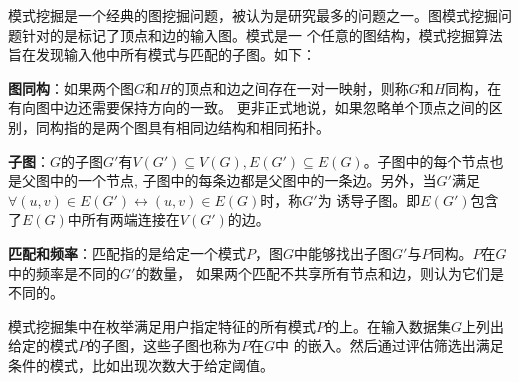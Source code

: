 \documentclass[master]{thesis-uestc}
\begin{document}
    模式挖掘是一个经典的图挖掘问题，被认为是研究最多的问题之一。图模式挖掘问题针对的是标记了顶点和边的输入图。模式是一
个任意的图结构，模式挖掘算法旨在发现输入他中所有模式与匹配的子图。如下：

    \textbf{图同构}：如果两个图$G$和$H$的顶点和边之间存在一对一映射，则称$G$和$H$同构，在有向图中边还需要保持方向的一致。
更非正式地说，如果忽略单个顶点之间的区别，同构指的是两个图具有相同边结构和相同拓扑。
    
    \textbf{子图}：$G$的子图$G'$有$V(G') \subseteq V(G), E(G') \subseteq E(G)$。子图中的每个节点也是父图中的一个节点,
子图中的每条边都是父图中的一条边。另外，当$G'$满足$\forall (u,v) \in E(G') \leftrightarrow (u,v) \in E(G)$时，称$G'$为
诱导子图。即$E(G')$包含了$E(G)$中所有两端连接在$V(G')$的边。

    \textbf{匹配和频率}：匹配指的是给定一个模式$P$，图$G$中能够找出子图$G'$与$P$同构。$P$在$G$中的频率是不同的$G'$的数量，
如果两个匹配不共享所有节点和边，则认为它们是不同的。
    
    模式挖掘集中在枚举满足用户指定特征的所有模式$P$的上。在输入数据集$G$上列出给定的模式$P$的子图，这些子图也称为$P$在$G$中
的嵌入。然后通过评估筛选出满足条件的模式，比如出现次数大于给定阈值。
\end{document}
